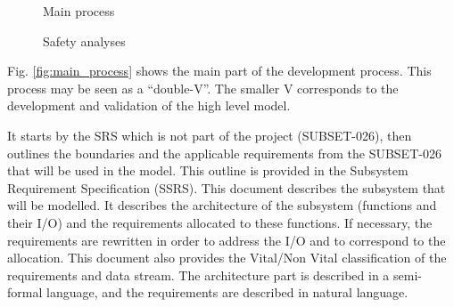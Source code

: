 \documentclass{template/openetcs_article}
\begin{document}
\begin{figure}
  \centering
  \caption{Main process}
  \label{fig:main_process}
  \centering
  \caption{Safety analyses}
  \label{fig:safety_process}
 \end{figure}

Fig. \ref{fig:main_process} shows the main part of the development process. This process may be seen
as a ``double-V''. The smaller V corresponds to the development and validation of the high level model. 

It starts by the SRS which is not part of the project (SUBSET-026), then outlines the boundaries and 
the applicable requirements from the SUBSET-026 that will be used in the model. This outline 
is provided in the Subsystem Requirement Specification (SSRS). This document describes the subsystem that 
will be modelled. It describes the architecture of the subsystem (functions and their I/O) and the 
requirements allocated to these functions. If necessary, the requirements are rewritten in order to 
address the I/O and to correspond to the allocation. This document also provides the Vital/Non Vital 
classification of the requirements and data stream. The architecture part is described in a 
semi-formal language, and the requirements are described in natural language.
\end{document}
